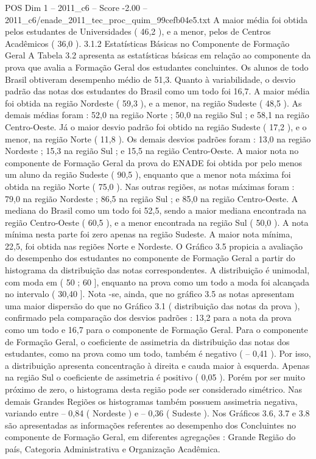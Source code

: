 \begin{textsample}{POS Dim 1 – 2011\_c6 – Score -2.00 – 2011\_c6/enade\_2011\_tec\_proc\_quim\_99cefb04e5.txt}
A maior média foi obtida pelos estudantes de Universidades ( 46,2 ), e a menor, pelos de Centros Acadêmicos ( 36,0 ). 3.1.2 Estatísticas Básicas no Componente de Formação Geral A Tabela 3.2 apresenta as estatísticas básicas em relação ao componente da prova que avalia a Formação Geral dos estudantes concluintes.
Os alunos de todo Brasil obtiveram desempenho médio de 51,3.
Quanto à variabilidade, o desvio padrão das notas dos estudantes do Brasil como um todo foi 16,7.
A maior média foi obtida na região Nordeste ( 59,3 ), e a menor, na região Sudeste ( 48,5 ).
As demais médias foram : 52,0 na região Norte ; 50,0 na região Sul ; e 58,1 na região Centro-Oeste.
Já o maior desvio padrão foi obtido na região Sudeste ( 17,2 ), e o menor, na região Norte ( 11,8 ).
Os demais desvios padrões foram : 13,0 na região Nordeste ; 15,3 na região Sul ; e 15,5 na região Centro-Oeste.
A maior nota no componente de Formação Geral da prova do ENADE foi obtida por pelo menos um aluno da região Sudeste ( 90,5 ), enquanto que a menor nota máxima foi obtida na região Norte ( 75,0 ).
Nas outras regiões, as notas máximas foram : 79,0 na região Nordeste ; 86,5 na região Sul ; e 85,0 na região Centro-Oeste.
A mediana do Brasil como um todo foi 52,5, sendo a maior mediana encontrada na região Centro-Oeste ( 60,5 ), e a menor encontrada na região Sul ( 50,0 ).
A nota mínima nesta parte foi zero apenas na região Sudeste.
A maior nota mínima, 22,5, foi obtida nas regiões Norte e Nordeste.
O Gráfico 3.5 propicia a avaliação do desempenho dos estudantes no componente de Formação Geral a partir do histograma da distribuição das notas correspondentes.
A distribuição é unimodal, com moda em ( 50 ; 60 ], enquanto na prova como um todo a moda foi alcançada no intervalo ( 30,40 ].
Nota -se, ainda, que no gráfico 3.5 as notas apresentam uma maior dispersão do que no Gráfico 3.1 ( distribuição das notas da prova ), confirmado pela comparação dos desvios padrões : 13,2 para a nota da prova como um todo e 16,7 para o componente de Formação Geral.
Para o componente de Formação Geral, o coeficiente de assimetria da distribuição das notas dos estudantes, como na prova como um todo, também é negativo ( – 0,41 ).
Por isso, a distribuição apresenta concentração à direita e cauda maior à esquerda.
Apenas na região Sul o coeficiente de assimetria é positivo ( 0,05 ).
Porém por ser muito próximo de zero, o histograma desta região pode ser considerado simétrico.
Nas demais Grandes Regiões os histogramas também possuem assimetria negativa, variando entre – 0,84 ( Nordeste ) e – 0,36 ( Sudeste ).
Nos Gráficos 3.6, 3.7 e 3.8 são apresentadas as informações referentes ao desempenho dos Concluintes no componente de Formação Geral, em diferentes agregações : Grande Região do país, Categoria Administrativa e Organização Acadêmica.

\end{textsample}
